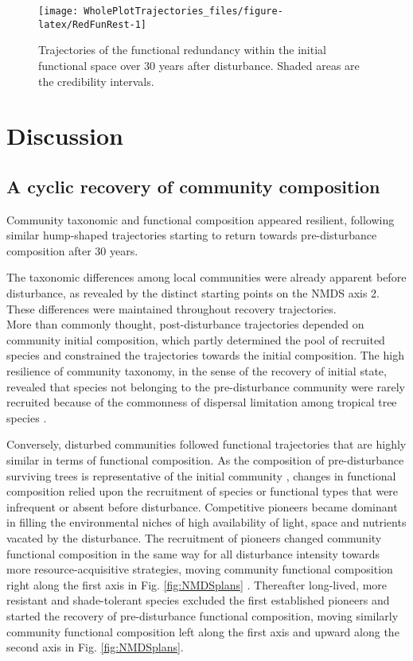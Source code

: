\documentclass[fleqn,10pt]{ArtEcoFoG} %
\begin{document}
\begin{figure}

{\centering \texttt{[image: WholePlotTrajectories\_files/figure-latex/RedFunRest-1]} 

}

\caption{Trajectories of the functional redundancy within the initial functional space over 30 years after disturbance. Shaded areas are the credibility intervals.}\label{fig:RedFunRest}
\end{figure}

\section{Discussion}\label{discussion}

\subsection{A cyclic recovery of community
composition}\label{a-cyclic-recovery-of-community-composition}

Community taxonomic and functional composition appeared resilient,
following similar hump-shaped trajectories starting to return towards
pre-disturbance composition after 30 years.

The taxonomic differences among local communities were already apparent
before disturbance, as revealed by the distinct starting points on the
NMDS axis 2. These differences were maintained throughout recovery
trajectories.\\
More than commonly thought, post-disturbance trajectories depended on
community initial composition, which partly determined the pool of
recruited species and constrained the trajectories towards the initial
composition. The high resilience of community taxonomy, in the sense of
the recovery of initial state, revealed that species not belonging to
the pre-disturbance community were rarely recruited because of the
commonness of dispersal limitation among tropical tree species
\citep{Svenning2005}.

Conversely, disturbed communities followed functional trajectories that
are highly similar in terms of functional composition. As the
composition of pre-disturbance surviving trees is representative of the
initial community \citep{Herault2018}, changes in functional composition
relied upon the recruitment of species or functional types that were
infrequent or absent before disturbance. Competitive pioneers became
dominant in filling the environmental niches of high availability of
light, space and nutrients vacated by the disturbance. The recruitment
of pioneers changed community functional composition in the same way for
all disturbance intensity towards more resource-acquisitive strategies,
moving community functional composition right along the first axis in
Fig. \ref{fig:NMDSplans} \citep{Westoby1998, Wright2004, Reich2014}.
Thereafter long-lived, more resistant and shade-tolerant species
excluded the first established pioneers and started the recovery of
pre-disturbance functional composition, moving similarly community
functional composition left along the first axis and upward along the
second axis in Fig. \ref{fig:NMDSplans}.
\end{document}
